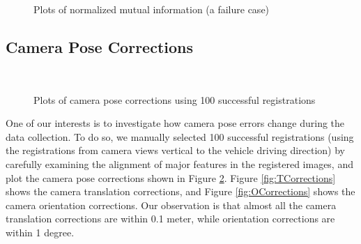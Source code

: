 \begin{figure}[H]
\centering
{} 
\hspace{.1in}
 \\
\hspace{.1in}
 \\
\hspace{.1in}
\caption{Plots of normalized mutual information (a failure case)} 
\label{fig:normalizedMI_failure}
\end{figure}

\subsection{Camera Pose Corrections}

\begin{figure}[H]
\centering
{} 
\hspace{.1in}
 \\
\caption{Plots of camera pose corrections using 100 successful registrations} 
\label{fig:CameraPoseCorrections100}
\end{figure}

One of our interests is to investigate how camera pose errors change during the data collection. To do so, we manually selected 100 successful registrations (using the registrations from camera views vertical to the vehicle driving direction) by carefully examining the alignment of major features in the registered images, and plot the camera pose corrections shown in Figure \ref{fig:CameraPoseCorrections100}.  Figure \ref{fig:TCorrections} shows the camera translation corrections, and Figure \ref{fig:OCorrections} shows the camera orientation corrections. Our observation is that almost all the camera translation corrections are within 0.1 meter, while orientation corrections are within 1 degree. 

